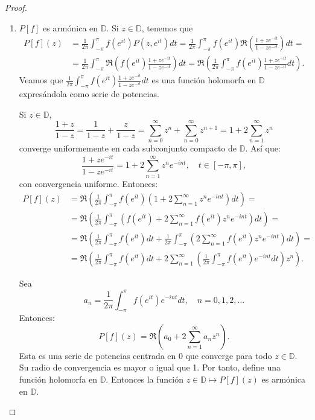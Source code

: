 \begin{proof}
    \hfill
    \begin{enumerate}
        \item $P[f]$ es armónica en $\mathbb{D}$.
              Si $z \in \mathbb{D}$, tenemos que
              \begin{align*}
                  P[f](z) & = \frac{1}{2\pi} \int_{-\pi}^\pi f(e^{it})P(z, e^{it})dt = \frac{1}{2\pi} \int_{-\pi}^\pi f(e^{it})\Re\left(\frac{1+ze^{-it}}{1-ze^{-it}}\right)dt =                                 \\
                          & = \frac{1}{2\pi} \int_{-\pi}^\pi \Re\left(f(e^{it})\frac{1+ze^{-it}}{1-ze^{-it}}\right)dt = \Re\left(\frac{1}{2\pi} \int_{-\pi}^\pi f(e^{it})\frac{1+ze^{-it}}{1-ze^{-it}}dt\right).
              \end{align*}
              Veamos que $\frac{1}{2\pi} \int_{-\pi}^\pi f(e^{it})\frac{1+ze^{-it}}{1-ze^{-it}}dt$ es una función holomorfa en $\mathbb{D}$ expresándola como serie de potencias.

              Si $z \in \mathbb{D}$,
              $$\frac{1+z}{1-z} = \frac{1}{1-z} + \frac{z}{1-z} = \sum_{n=0}^\infty z^n + \sum_{n=0}^\infty z^{n+1} = 1 + 2\sum_{n=1}^\infty z^n$$
              converge uniformemente en cada subconjunto compacto de $\mathbb{D}$.
              Así que:
              $$\frac{1+ze^{-it}}{1-ze^{-it}} = 1 + 2\sum_{n=1}^\infty z^ne^{-int}, \quad t \in [-\pi, \pi],$$
              con convergencia uniforme.
              Entonces:
              \begin{align*}
                  P[f](z) & = \Re\left(\frac{1}{2\pi} \int_{-\pi}^\pi f(e^{it})\left(1 + 2\sum_{n=1}^\infty z^ne^{-int}\right)dt\right) =                                          \\
                          & = \Re\left(\frac{1}{2\pi} \int_{-\pi}^\pi \left(f(e^{it}) + 2\sum_{n=1}^\infty f(e^{it})z^ne^{-int}\right)dt\right) =                                  \\
                          & = \Re\left(\frac{1}{2\pi} \int_{-\pi}^\pi f(e^{it})dt + \frac{1}{2\pi} \int_{-\pi}^\pi \left(2\sum_{n=1}^\infty f(e^{it})z^ne^{-int}\right)dt\right) = \\
                          & = \Re\left(\frac{1}{2\pi} \int_{-\pi}^\pi f(e^{it})dt + 2\sum_{n=1}^\infty\left(\frac{1}{2\pi} \int_{-\pi}^\pi f(e^{it})e^{-int}dt\right)z^n\right).
              \end{align*}

              Sea
              $$a_n = \frac{1}{2\pi} \int_{-\pi}^\pi f(e^{it})e^{-int}dt, \quad n = 0, 1, 2, \dots$$
              Entonces:
              $$P[f](z) = \Re\left(a_0 + 2\sum_{n=1}^\infty a_nz^n\right).$$
              Esta es una serie de potencias centrada en 0 que converge para todo $z \in \mathbb{D}$.
              Su radio de convergencia es mayor o igual que 1.
              Por tanto, define una función holomorfa en $\mathbb{D}$.
              Entonces la función $z \in \mathbb{D} \mapsto P[f](z)$ es armónica en $\mathbb{D}$.


\end{enumerate}
\end{proof}

